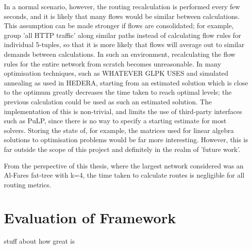 In a normal scenario, however, the routing recalculation is performed every few seconds, and it is likely that many flows would be similar between calculations. This assumption can be made stronger if flows are consolidated; for example, group 'all HTTP traffic' along similar paths instead of calculating flow rules for individual 5-tuples, so that it is more likely that flows will average out to similar demands between calculations. In such an environment, recalculating the flow rules for the entire network from scratch becomes unreasonable. In many optimisation techniques, such as WHATEVER GLPK USES and simulated annealing as used in HEDERA, starting from an estimated solution which is close to the optimum greatly decreases the time taken to reach optimal levels; the previous calculation could be used as such an estimated solution. The implementation of this is non-trivial, and limits the use of third-party interfaces such as PuLP, since there is no way to specify a starting estimate for most solvers. Storing the state of, for example, the matrices used for linear algebra solutions to optimisation problems would be far more interesting. However, this is far outside the scope of this project and definitely in the realm of 'future work'.

From the perspective of this thesis, where the largest network considered was an Al-Fares fat-tree with k=4, the time taken to calculate routes is negligible for all routing metrics.


\section{Evaluation of Framework}

stuff about how great \thesis is

